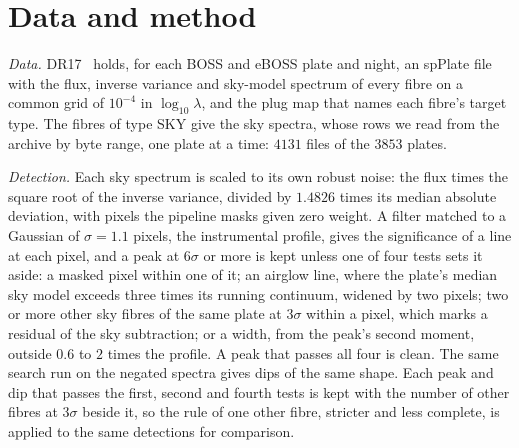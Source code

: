 \documentclass[3p,11pt]{elsarticle}
\begin{document}
\section{Data and method}\label{sec:method}

\emph{Data.} DR17~\cite{Abdurrouf2022} holds, for each BOSS and eBOSS plate and night,
an spPlate file with the flux, inverse variance and sky-model spectrum of every fibre on
a common grid of $10^{-4}$ in $\log_{10}\lambda$, and the plug map that names each
fibre's target type. The fibres of type SKY give the sky spectra, whose rows we read from
the archive by byte range, one plate at a time: $4131$ files of the $3853$ plates.

\emph{Detection.} Each sky spectrum is scaled to its own robust noise: the flux times
the square root of the inverse variance, divided by $1.4826$ times its median absolute
deviation, with pixels the pipeline masks given zero weight. A filter matched to a
Gaussian of $\sigma=1.1$ pixels, the instrumental profile, gives the significance of a
line at each pixel, and a peak at $6\sigma$ or more is kept unless one of four tests sets
it aside: a masked pixel within one of it; an airglow line, where the plate's median
sky model exceeds three times its running continuum, widened by two pixels; two or more
other sky fibres of the same plate at $3\sigma$ within a pixel, which marks a residual of
the sky subtraction; or a width, from the peak's second moment, outside $0.6$ to $2$
times the profile. A peak that passes all four is clean. The same search run on the
negated spectra gives dips of the same shape. Each peak and dip that passes the first,
second and fourth tests is kept with the number of other fibres at $3\sigma$ beside it,
so the rule of one other fibre, stricter and less complete, is applied to the same
detections for comparison.
\end{document}
